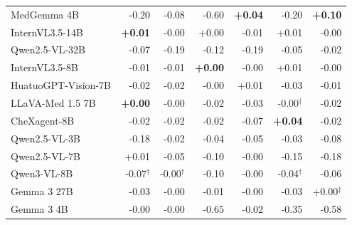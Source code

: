\documentclass{article}
\begin{document}
\begin{table}[htbp]
{\begin{tabular}{lrrrrrr}
MedGemma 4B & \cellcolor{cfSlate3}-0.20 & \cellcolor{cfSlate2}-0.08 & \cellcolor{cfSlate4}-0.60 & \cellcolor{cfTerra2}\textbf{+0.04} & \cellcolor{cfSlate3}-0.20 & \cellcolor{cfTerra3}\textbf{+0.10} \\
InternVL3.5-14B & \cellcolor{cfTerra1}\textbf{+0.01} & \cellcolor{cfSlate1}-0.00 & \cellcolor{cfTerra1}+0.00 & \cellcolor{cfSlate1}-0.01 & \cellcolor{cfTerra1}+0.01 & \cellcolor{cfSlate1}-0.00 \\
Qwen2.5-VL-32B & \cellcolor{cfSlate2}-0.07 & \cellcolor{cfSlate3}-0.19 & \cellcolor{cfSlate3}-0.12 & \cellcolor{cfSlate3}-0.19 & \cellcolor{cfSlate2}-0.05 & \cellcolor{cfSlate2}-0.02 \\
InternVL3.5-8B & \cellcolor{cfSlate1}-0.01 & \cellcolor{cfSlate1}-0.01 & \cellcolor{cfTerra1}\textbf{+0.00} & \cellcolor{cfSlate1}-0.00 & \cellcolor{cfTerra1}+0.01 & \cellcolor{cfSlate1}-0.00 \\
HuatuoGPT-Vision-7B & \cellcolor{cfSlate2}-0.02 & \cellcolor{cfSlate1}-0.02 & \cellcolor{cfSlate1}-0.00 & \cellcolor{cfTerra1}+0.01 & \cellcolor{cfSlate2}-0.03 & \cellcolor{cfSlate1}-0.01 \\
LLaVA-Med 1.5 7B & \cellcolor{cfTerra1}\textbf{+0.00} & \cellcolor{cfSlate1}-0.00 & \cellcolor{cfSlate2}-0.02 & \cellcolor{cfSlate2}-0.03 & \cellcolor{cfSlate1}-0.00$^{\dagger}$ & \cellcolor{cfSlate1}-0.02 \\
CheXagent-8B & \cellcolor{cfSlate2}-0.02 & \cellcolor{cfSlate1}-0.02 & \cellcolor{cfSlate2}-0.02 & \cellcolor{cfSlate2}-0.07 & \cellcolor{cfTerra2}\textbf{+0.04} & \cellcolor{cfSlate2}-0.02 \\
Qwen2.5-VL-3B & \cellcolor{cfSlate3}-0.18 & \cellcolor{cfSlate1}-0.02 & \cellcolor{cfSlate2}-0.04 & \cellcolor{cfSlate2}-0.05 & \cellcolor{cfSlate2}-0.03 & \cellcolor{cfSlate2}-0.08 \\
Qwen2.5-VL-7B & \cellcolor{cfTerra1}+0.01 & \cellcolor{cfSlate2}-0.05 & \cellcolor{cfSlate2}-0.10 & \cellcolor{cfSlate1}-0.00 & \cellcolor{cfSlate3}-0.15 & \cellcolor{cfSlate3}-0.18 \\
Qwen3-VL-8B & \cellcolor{cfSlate2}-0.07$^{\dagger}$ & \cellcolor{cfSlate1}-0.00$^{\dagger}$ & \cellcolor{cfSlate2}-0.10 & \cellcolor{cfSlate1}-0.00 & \cellcolor{cfSlate2}-0.04$^{\dagger}$ & \cellcolor{cfSlate2}-0.06 \\
Gemma 3 27B & \cellcolor{cfSlate2}-0.03 & \cellcolor{cfSlate1}-0.00 & \cellcolor{cfSlate1}-0.01 & \cellcolor{cfSlate1}-0.00 & \cellcolor{cfSlate2}-0.03 & \cellcolor{cfTerra1}+0.00$^{\ddagger}$ \\
Gemma 3 4B & \cellcolor{cfSlate1}-0.00 & \cellcolor{cfSlate1}-0.00 & \cellcolor{cfSlate4}-0.65 & \cellcolor{cfSlate1}-0.02 & \cellcolor{cfSlate4}-0.35 & \cellcolor{cfSlate4}-0.58 \\

\end{tabular}}
\end{table}
\end{document}
